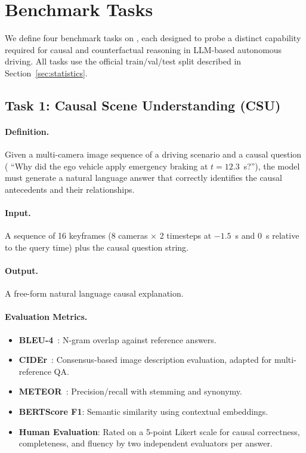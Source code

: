 \section{Benchmark Tasks}
\label{sec:benchmarks}

We define four benchmark tasks on \lucid{}, each designed to probe a distinct
capability required for causal and counterfactual reasoning in LLM-based autonomous driving.
All tasks use the official train/val/test split described in Section~\ref{sec:statistics}.

\subsection{Task 1: Causal Scene Understanding (CSU)}
\label{ssec:task_csu}

\paragraph{Definition.}
Given a multi-camera image sequence of a driving scenario and a causal question
(\eg{} ``Why did the ego vehicle apply emergency braking at $t = 12.3$~s?''),
the model must generate a natural language answer that correctly identifies the
causal antecedents and their relationships.

\paragraph{Input.}
A sequence of 16 keyframes (8 cameras $\times$ 2 timesteps at $-1.5$~s and $0$~s
relative to the query time) plus the causal question string.

\paragraph{Output.}
A free-form natural language causal explanation.

\paragraph{Evaluation Metrics.}
\begin{itemize}[leftmargin=2em, noitemsep]
  \item \textbf{BLEU-4}~\cite{papineni2002bleu}: N-gram overlap against reference answers.
  \item \textbf{CIDEr}~\cite{vedantam2015cider}: Consensus-based image description evaluation,
        adapted for multi-reference QA.
  \item \textbf{METEOR}~\cite{banerjee2005meteor}: Precision/recall with stemming and synonymy.
  \item \textbf{BERTScore F1}: Semantic similarity using contextual embeddings.
  \item \textbf{Human Evaluation}: Rated on a 5-point Likert scale for causal correctness,
        completeness, and fluency by two independent evaluators per answer.
\end{itemize}

